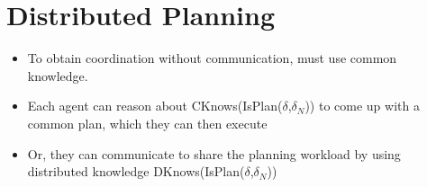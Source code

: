 \section{Distributed Planning}
\begin{itemize}
\item To obtain coordination without communication, must use common knowledge.
\item Each agent can reason about CKnows(IsPlan($\delta$,$\delta_N$)) to come up with a common plan, which they can then execute
\item Or, they can communicate to share the planning workload by using distributed knowledge DKnows(IsPlan($\delta$,$\delta_N$))
\end{itemize}


